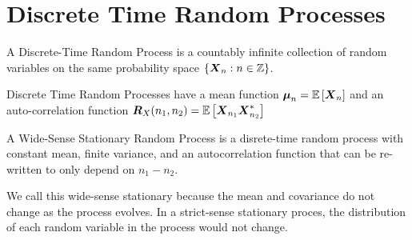 \section{Discrete Time Random Processes}
\begin{definition}
	A Discrete-Time Random Process is a countably infinite collection of random variables on the same probability space $\{\boldsymbol{X}_n: n\in\mathbb{Z}\}$.
	\label{defn:discrete-time-rp}
\end{definition}
Discrete Time Random Processes have a mean function $\boldsymbol{\mu}_n = \mathbb{E}\left[\boldsymbol{X}_n\right]$ and an auto-correlation function $\boldsymbol{R}_X(n_1, n_2) = \mathbb{E}\left[\boldsymbol{X}_{n_1}\boldsymbol{X}_{n_2}^*\right]$
\begin{definition}
	A Wide-Sense Stationary Random Process is a disrete-time random process with constant mean, finite variance, and an autocorrelation function that can be re-written to only depend on $n_1-n_2$.
	\label{defn:wss-process}
\end{definition}
We call this wide-sense stationary because the mean and covariance do not change as the process evolves.
In a strict-sense stationary proces, the distribution of each random variable in the process would not change.


